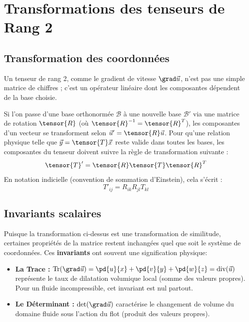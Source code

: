 \chapter{Transformations des tenseurs de Rang 2 \label{ch:a_tenseurs}}

\section{Transformation des coordonnées}
Un tenseur de rang 2, comme le gradient de vitesse $\grad\vec{u}$, n'est pas une simple matrice de chiffres ; c'est un opérateur linéaire dont les composantes dépendent de la base choisie. 

Si l'on passe d'une base orthonormée $\mathcal{B}$ à une nouvelle base $\mathcal{B}'$ via une matrice de rotation $\tensor{R}$ (où $\tensor{R}^{-1} = \tensor{R}^T$), les composantes d'un vecteur se transforment selon $\vec{u}' = \tensor{R}\vec{u}$. Pour qu'une relation physique telle que $\vec{y} = \tensor{T}\vec{x}$ reste valide dans toutes les bases, les composantes du tenseur doivent suivre la règle de transformation suivante :
\begin{equation}
    \tensor{T}' = \tensor{R} \tensor{T} \tensor{R}^T
\end{equation}
En notation indicielle (convention de sommation d'Einstein), cela s'écrit :
\begin{equation}
    T'_{ij} = R_{ik}R_{jl}T_{kl}
\end{equation}


\section{Invariants scalaires}
Puisque la transformation ci-dessus est une transformation de similitude, certaines propriétés de la matrice restent inchangées quel que soit le système de coordonnées. Ces \textbf{invariants} ont souvent une signification physique:

\begin{itemize}
    \item \textbf{La Trace :} $\text{Tr}(\grad\vec{u}) = \pd{u}{x} + \pd{v}{y} + \pd{w}{z} = \text{div}(\vec{u})$ représente le taux de dilatation volumique local (somme des valeurs propres). Pour un fluide incompressible, cet invariant est nul partout.
    \item \textbf{Le Déterminant :} $\det(\grad\vec{u})$ caractérise le changement de volume du domaine fluide sous l'action du flot (produit des valeurs propres). 
\end{itemize}


